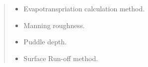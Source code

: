 \documentclass[letterpaper,10pt,english]{sphinxmanual}
\begin{document}
\begin{fulllineitems}
\begin{fulllineitems}
\begin{quote}
\begin{description}
\begin{itemize}
\item {} 
 \textendash{} Evapotranspriation calculation method.

\item {} 
 \textendash{} Manning roughness.

\item {} 
 \textendash{} Puddle depth.

\item {} 
 \textendash{} Surface Run-off method.

\end{itemize}

\end{description}\end{quote}

\end{fulllineitems}


\end{fulllineitems}

\end{document}
